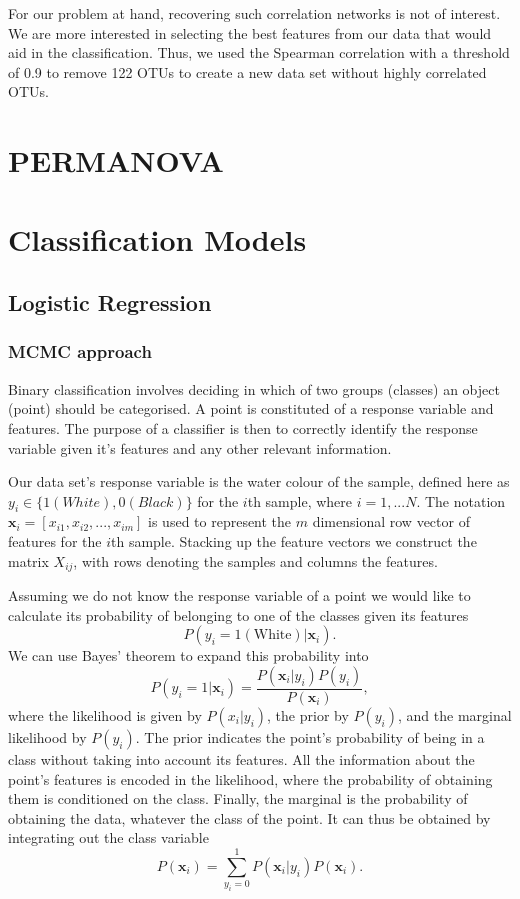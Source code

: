 For our problem at hand, recovering such correlation networks is not of interest. We are more interested in selecting the best features from our data that would aid in the classification. Thus, we used the Spearman correlation with a threshold of 0.9 to remove 122 OTUs to create a new data set without highly correlated OTUs. 








\section{PERMANOVA}
\section{Classification Models}
\subsection{Logistic Regression}
\subsubsection{MCMC approach}
Binary classification involves deciding in which of two groups (classes) an object (point) should be categorised. A point is constituted of a response variable and features. The purpose of a classifier is then to correctly identify the response variable given it's features and any other relevant information. 

Our data set's response variable is the water colour of the sample, defined here as $y_i \in \{ 1 (White),0 (Black)\}$ for the $i$th sample, where $i=1,...N$. The notation $ \mathbf{x}_i = [x_{i1},x_{i2},...,x_{im}]$ is used to represent the $m$ dimensional row vector of features for the $i$th sample. Stacking up the feature vectors we construct the matrix $X_{ij}$, with rows denoting the samples and columns the features.

Assuming we do not know the response variable of a point we would like to calculate its probability of belonging to one of the classes  given its features
\begin{equation}
	P(y_i = 1(\text{White})| \mathbf{x}_i).
\end{equation}  
We can use Bayes' theorem to expand this probability into
\begin{equation}
	P(y_i =1| \mathbf{x}_i) = \frac{P( \mathbf{x}_i|y_i)P(y_i)}{P( \mathbf{x}_i)},
\end{equation}
 where the likelihood is given by $P(x_i|y_i)$, the prior by $P(y_i)$, and the marginal likelihood by $P(y_i)$. The prior indicates the point's probability of being in a class without taking into account its features. All the information about the point's features is encoded in the likelihood, where the probability of obtaining them is conditioned on the class. Finally, the marginal is the probability of obtaining the data, whatever the class of the point. 
 It can thus  be obtained by integrating out the class variable
 \begin{equation}
 	P( \mathbf{x}_i) = \sum_{y_i =0}^{1} P( \mathbf{x}_i|y_i)P( \mathbf{x}_i).
 \end{equation} 

